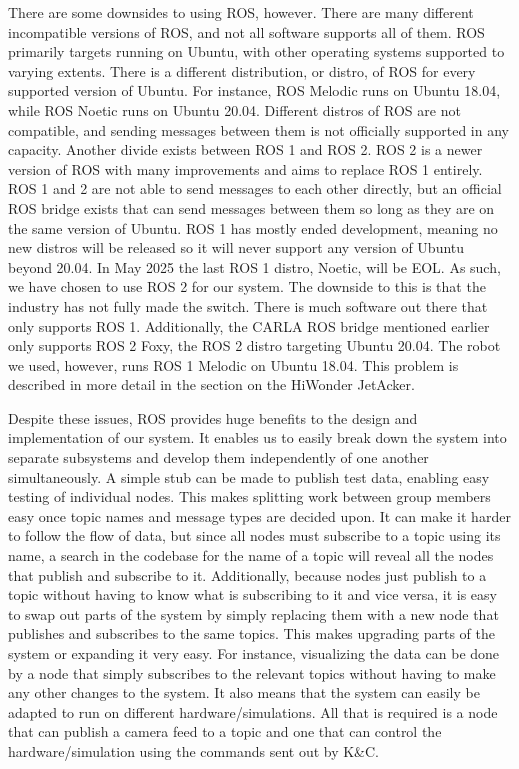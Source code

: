 \documentclass[titlepage, draft]{article}
\begin{document}
{There are some downsides to using ROS, however. There are many different incompatible versions of ROS, and not all software supports all of them. ROS primarily targets running on Ubuntu, with other operating systems supported to varying extents. There is a different distribution, or distro, of ROS for every supported version of Ubuntu. For instance, ROS Melodic runs on Ubuntu 18.04, while ROS Noetic runs on Ubuntu 20.04. Different distros of ROS are not compatible, and sending messages between them is not officially supported in any capacity. Another divide exists between ROS 1 and ROS 2. ROS 2 is a newer version of ROS with many improvements and aims to replace ROS 1 entirely. ROS 1 and 2 are not able to send messages to each other directly, but an official ROS bridge exists that can send messages between them so long as they are on the same version of Ubuntu. ROS 1 has mostly ended development, meaning no new distros will be released so it will never support any version of Ubuntu beyond 20.04. In May 2025 the last ROS 1 distro, Noetic, will be EOL. As such, we have chosen to use ROS 2 for our system. The downside to this is that the industry has not fully made the switch. There is much software out there that only supports ROS 1. Additionally, the CARLA ROS bridge mentioned earlier only supports ROS 2 Foxy, the ROS 2 distro targeting Ubuntu 20.04. The robot we used, however, runs ROS 1 Melodic on Ubuntu 18.04. This problem is described in more detail in the section on the HiWonder JetAcker.

Despite these issues, ROS provides huge benefits to the design and implementation of our system. It enables us to easily break down the system into separate subsystems and develop them independently of one another simultaneously. A simple stub can be made to publish test data, enabling easy testing of individual nodes. This makes splitting work between group members easy once topic names and message types are decided upon. It can make it harder to follow the flow of data, but since all nodes must subscribe to a topic using its name, a search in the codebase for the name of a topic will reveal all the nodes that publish and subscribe to it. Additionally, because nodes just publish to a topic without having to know what is subscribing to it and vice versa, it is easy to swap out parts of the system by simply replacing them with a new node that publishes and subscribes to the same topics. This makes upgrading parts of the system or expanding it very easy. For instance, visualizing the data can be done by a node that simply subscribes to the relevant topics without having to make any other changes to the system. It also means that the system can easily be adapted to run on different hardware/simulations. All that is required is a node that can publish a camera feed to a topic and one that can control the hardware/simulation using the commands sent out by K\&C.

}
\end{document}
